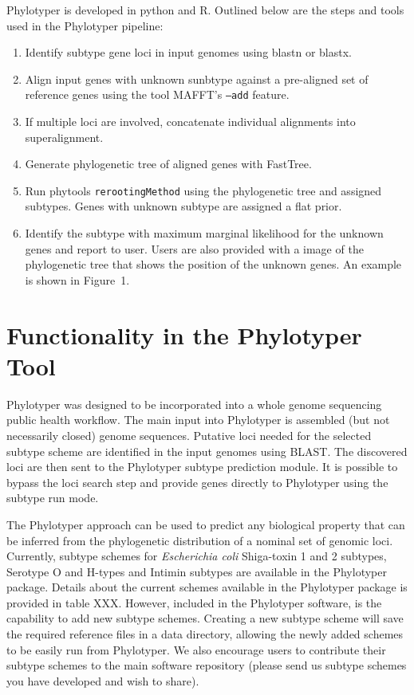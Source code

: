 \documentclass{bioinfo}
\begin{document}
Phylotyper is developed in python and R. 
Outlined below are the steps and tools used in the Phylotyper pipeline:

\begin{enumerate}
\item Identify subtype gene loci in input genomes using blastn or blastx.
\item Align input genes with unknown sunbtype against a pre-aligned set of reference genes using the tool MAFFT's \texttt{--add} feature.
\item If multiple loci are involved, concatenate individual alignments into superalignment.
\item Generate phylogenetic tree of aligned genes with FastTree.
\item Run phytools \texttt{rerootingMethod} using the phylogenetic tree and assigned subtypes. 
Genes with unknown subtype are assigned a flat prior.
\item Identify the subtype with maximum marginal likelihood for the unknown genes and report to user.
Users are also provided with a image of the phylogenetic tree that shows the position of the unknown genes. 
An example is shown in Figure~1\vphantom{\ref{fig:01}}.
\end{enumerate}

\section{Functionality in the Phylotyper Tool}

Phylotyper was designed to be incorporated into a whole genome sequencing public health workflow.  
The main input into Phylotyper is assembled (but not necessarily closed) genome sequences.  
Putative loci needed for the selected subtype scheme are identified in the input genomes using BLAST.
The discovered loci are then sent to the Phylotyper subtype prediction module.
It is possible to bypass the loci search step and provide genes directly to Phylotyper using the subtype run mode.

The Phylotyper approach can be used to predict any biological property that can be inferred from the phylogenetic distribution of a nominal set of genomic loci.
Currently, subtype schemes for \emph{Escherichia coli} Shiga-toxin 1 and 2 subtypes, Serotype O and H-types and Intimin subtypes are available in the Phylotyper package.
Details about the current schemes available in the Phylotyper package is provided in table XXX.
However, included in the Phylotyper software, is the capability to add new subtype schemes. 
Creating a new subtype scheme will save the required reference files in a data directory, allowing the newly added schemes to be easily run from Phylotyper. 
We also encourage users to contribute their subtype schemes to the main software repository (please send us subtype schemes you have developed and wish to share).
\end{document}
